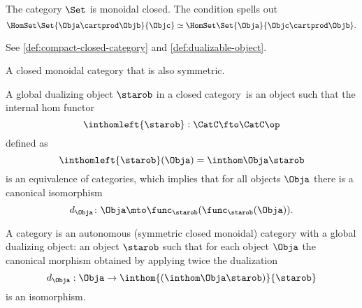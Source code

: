 \begin{example}
    The category $\Set$ is monoidal closed.
    The condition
    spells out
    \begin{equation}
        \HomSet\Set{\Obja\cartprod\Objb}{\Objc} \simeq \HomSet\Set{\Obja}{\Objc\cartprod\Objb}.
    \end{equation}

\end{example}

See \cref{def:compact-closed-category} and \cref{def:dualizable-object}.

%
%

\begin{definition}
    \label{def:autonomous-category}
    A closed monoidal category that is also symmetric.
\end{definition}

\begin{definition}
    \label{def:global-dualizing-object}
    A global dualizing object $\starob$ in a closed category~\CatC is an object such that the internal hom functor
    \begin{equation}
        \inthomleft{\starob}: \CatC \fto \CatC\op
    \end{equation}
    defined as
    \begin{equation}
        \inthomleft{\starob}(\Obja) = \inthom\Obja\starob
    \end{equation}
    is an equivalence of categories, which implies that for all objects $\Obja$ there is a canonical isomorphism
    \begin{equation}
        d_{\Obja}\colon\Obja\mto \func_{\starob}(\func_{\starob}(\Obja)).
    \end{equation}
\end{definition}

\begin{definition}
    \label{def:star-autonomous-category-1}
    A \starautonomous category is an autonomous (symmetric closed monoidal) category with a global dualizing object: an object $\starob$ such that for each object $\Obja$ the canonical morphism
    obtained by applying twice the dualization
    \begin{equation}
        d_{\Obja}: \Obja \to \inthom{(\inthom\Obja\starob)}{\starob}
    \end{equation}
    is an isomorphism.
\end{definition}

